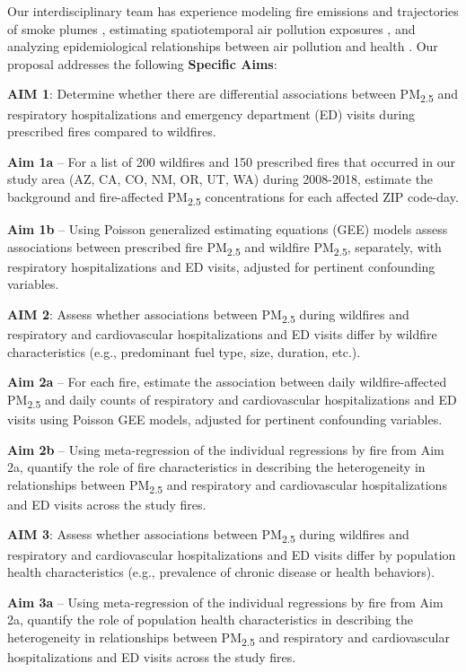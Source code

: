Our interdisciplinary team has experience modeling fire emissions and trajectories of smoke plumes \citep{thelen_modeling_2013}, estimating spatiotemporal air pollution exposures \citep{thelen_modeling_2013,reid_spatiotemporal_2015}, and analyzing epidemiological relationships between air pollution and health \citep{reid_differential_2016,crooks_association_2016}. 
Our proposal addresses the following \textbf{Specific Aims}: 
\medskip

\noindent\textbf{AIM 1}: Determine whether there are differential associations between PM\textsubscript{2.5} and respiratory hospitalizations and emergency department (ED) visits during prescribed fires compared to wildfires.

\textbf{Aim 1a} – For a list of 200 wildfires and 150 prescribed fires that occurred in our study area (AZ, CA, CO, NM, OR, UT, WA) during 2008-2018, estimate the background and fire-affected PM\textsubscript{2.5} concentrations for each affected ZIP code-day.

\textbf{Aim 1b} – Using Poisson generalized estimating equations (GEE) models assess associations between prescribed fire PM\textsubscript{2.5} and wildfire PM\textsubscript{2.5}, separately, with respiratory hospitalizations and ED visits, adjusted for pertinent confounding variables. 

\noindent\textbf{AIM 2}: Assess whether associations between PM\textsubscript{2.5} during wildfires and respiratory and cardiovascular hospitalizations and ED visits differ by wildfire characteristics (e.g., predominant fuel type, size, duration, etc.).

\textbf{Aim 2a} – For each fire, estimate 
the association between daily wildfire-affected PM\textsubscript{2.5} and daily counts of respiratory and cardiovascular hospitalizations and ED visits using Poisson GEE models, adjusted for pertinent confounding variables. 

\textbf{Aim 2b} – Using meta-regression of the individual regressions by fire from Aim 2a, quantify the role of fire characteristics in describing the heterogeneity in relationships between PM\textsubscript{2.5} and respiratory and cardiovascular hospitalizations and ED visits across the study fires. 

\noindent\textbf{AIM 3}: Assess whether associations between PM\textsubscript{2.5} during wildfires and respiratory and cardiovascular hospitalizations and ED visits differ by population health characteristics (e.g., prevalence of chronic disease or health behaviors).

\textbf{Aim 3a} – Using meta-regression of the individual regressions by fire from Aim 2a, quantify the role of population health characteristics in describing the heterogeneity in relationships between PM\textsubscript{2.5} and respiratory and cardiovascular hospitalizations and ED visits across the study fires.
